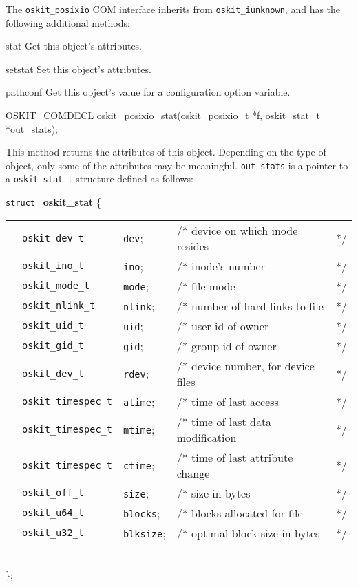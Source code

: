 	The {\tt oskit_posixio} COM interface inherits from {\tt oskit_iunknown},
and has the following additional methods:	
\begin{icsymlist}
\item[stat]
	Get this object's attributes.
\item[setstat]
	Set this object's attributes.
\item[pathconf]
	Get this object's value for a configuration option variable. 
\end{icsymlist}

\begin{apisyn}

	\funcproto OSKIT_COMDECL
	oskit_posixio_stat(oskit_posixio_t *f, 
			   \outparam oskit_stat_t *out_stats);
\end{apisyn}
\begin{apidesc}
	This method returns the attributes of this object.
	Depending on the type of object, only some of the attributes
	may be meaningful.  {\tt out_stats} is a pointer to a 
	{\tt oskit_stat_t} structure defined as follows: 
{\par{\tt struct } {\large\bf oskit_stat} \{\\
\begin{tabular}{lllll}
\quad&{\tt oskit_dev_t}&{\tt	dev};&/* device on which inode resides &*/\\
\quad&{\tt oskit_ino_t}&{\tt ino};&/* inode's number &*/\\
\quad&{\tt oskit_mode_t}&{\tt mode};&/* file mode &*/\\
\quad&{\tt oskit_nlink_t}&{\tt nlink};&/* number of hard links to file &*/\\
\quad&{\tt oskit_uid_t}&{\tt uid};&/* user id of owner &*/\\
\quad&{\tt oskit_gid_t}&{\tt gid};&/* group id of owner &*/\\
\quad&{\tt oskit_dev_t}&{\tt rdev};&/* device number, for device files &*/\\
\quad&{\tt oskit_timespec_t}&{\tt atime};&/* time of last access &*/\\
\quad&{\tt oskit_timespec_t}&{\tt mtime};&/* time of last data modification &*/\\
\quad&{\tt oskit_timespec_t}&{\tt ctime};&/* time of last attribute change &*/\\
\quad&{\tt oskit_off_t}&{\tt size};&/* size in bytes &*/\\
\quad&{\tt oskit_u64_t}&{\tt blocks};&/* blocks allocated for file &*/ \\
\quad&{\tt oskit_u32_t}&{\tt blksize};&/* optimal block size in bytes &*/\\
\end{tabular} \\ \}; }
\end{apidesc}
